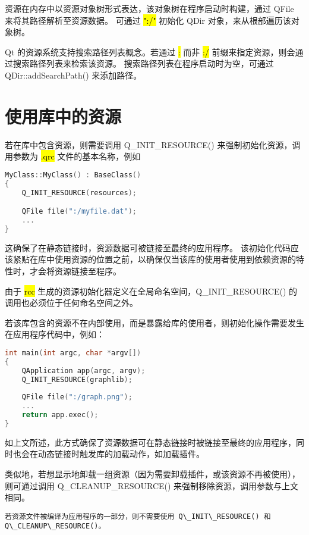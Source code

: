 资源在内存中以资源对象树形式表达，该对象树在程序启动时构建，通过 QFile 来将其路径解析至资源数据。
可通过 \hl{":/"} 初始化 QDir 对象，来从根部遍历该对象树。

Qt 的资源系统支持搜索路径列表概念。若通过 \hl{:} 而非 \hl{:/} 前缀来指定资源，则会通过搜索路径列表来检索该资源。
搜索路径列表在程序启动时为空，可通过 QDir::addSearchPath() 来添加路径。

\section{使用库中的资源}

若在库中包含资源，则需要调用 Q\_INIT\_RESOURCE() 来强制初始化资源，调用参数为 \hl{.qrc} 文件的基本名称，例如

\begin{lstlisting}[language=C++]
MyClass::MyClass() : BaseClass()
{
    Q_INIT_RESOURCE(resources);

    QFile file(":/myfile.dat");
    ...
}
\end{lstlisting}


这确保了在静态链接时，资源数据可被链接至最终的应用程序。
该初始化代码应该紧贴在库中使用资源的位置之前，以确保仅当该库的使用者使用到依赖资源的特性时，才会将资源链接至程序。

\begin{notice}
由于 \hl{rcc} 生成的资源初始化器定义在全局命名空间，Q\_INIT\_RESOURCE() 的调用也必须位于任何命名空间之外。
\end{notice}

若该库包含的资源不在内部使用，而是暴露给库的使用者，则初始化操作需要发生在应用程序代码中，例如：

\begin{lstlisting}[language=C++]
int main(int argc, char *argv[])
{
    QApplication app(argc, argv);
    Q_INIT_RESOURCE(graphlib);
    
    QFile file(":/graph.png");
    ...
    return app.exec();
}    
\end{lstlisting}

如上文所述，此方式确保了资源数据可在静态链接时被链接至最终的应用程序，同时也会在动态链接时触发库的加载动作，如加载插件。

类似地，若想显示地卸载一组资源（因为需要卸载插件，或该资源不再被使用），则可通过调用 Q\_CLEANUP\_RESOURCE() 来强制移除资源，调用参数与上文相同。

\begin{lstlisting}
若资源文件被编译为应用程序的一部分，则不需要使用 Q\_INIT\_RESOURCE() 和 Q\_CLEANUP\_RESOURCE()。
\end{lstlisting}